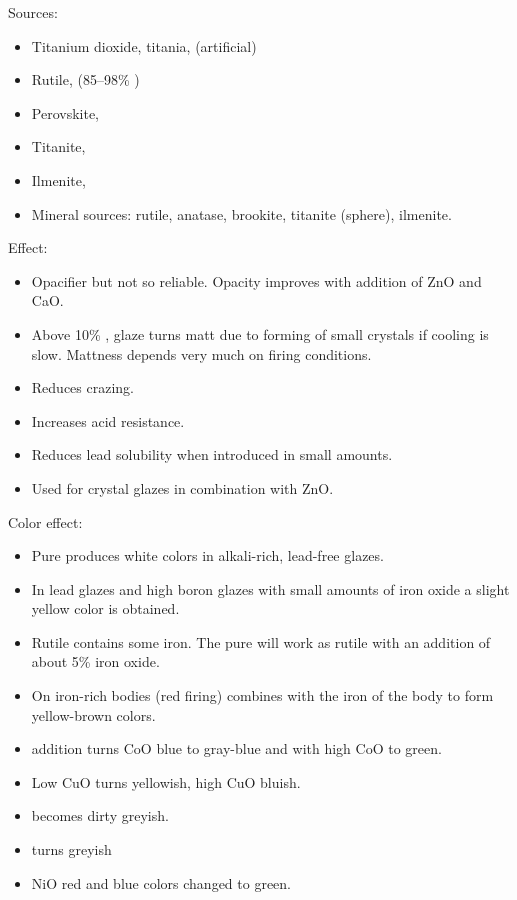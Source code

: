 Sources:
\begin{itemize}
  \item Titanium dioxide, titania,  (artificial)
  \item Rutile,  (85--98\% )
  \item Perovskite, 
  \item Titanite, 
  \item Ilmenite, 
  \item Mineral sources: rutile, anatase, brookite, titanite (sphere), ilmenite.
\end{itemize}
Effect:
\begin{itemize}
  \item Opacifier but not so reliable. Opacity improves with addition of ZnO 
  and CaO.
  \item Above 10\% , glaze turns matt due to forming of small crystals 
  if cooling is slow. Mattness depends very much on firing conditions.
  \item Reduces crazing.
  \item Increases acid resistance.
  \item Reduces lead solubility when introduced in small amounts.
  \item Used for crystal glazes in combination with ZnO.
\end{itemize}
Color effect:
\begin{itemize}
  \item Pure  produces white colors in alkali-rich, lead-free glazes.
  \item In lead glazes and high boron glazes with small amounts of iron oxide a 
  slight yellow color is obtained.
  \item Rutile contains some iron. The pure  will work as rutile with 
  an addition of about 5\% iron oxide.
  \item On iron-rich bodies (red firing)  combines with the iron of 
  the body to form yellow-brown colors.
  \item {} addition turns CoO blue to gray-blue and with high CoO to 
  green.
  \item Low CuO turns yellowish, high CuO bluish.
  \item {} becomes dirty greyish.
  \item {} turns greyish
  \item NiO red and blue colors changed to green.
\end{itemize}
